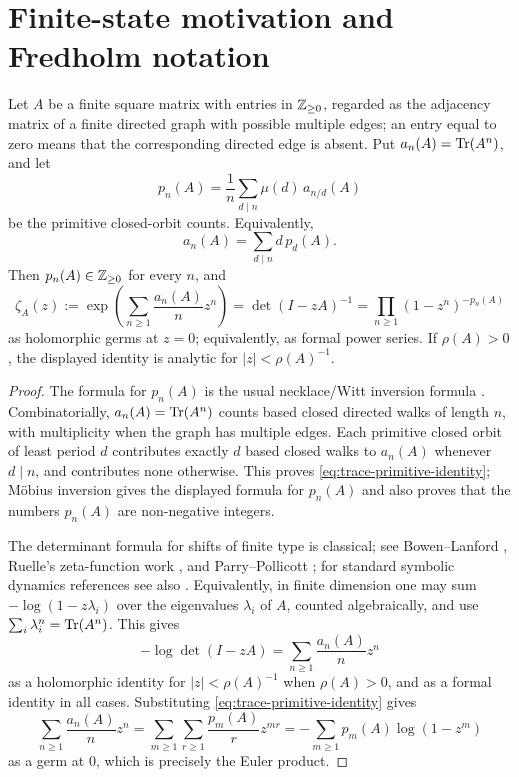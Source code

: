 \section{Finite-state motivation and Fredholm notation}
\label{sec:preliminaries}

\begin{proposition}
  \label{prop:primitive-symbolic-exclusion}
  Let \(A\) be a finite square matrix with entries in \(\mathbb{Z}_{\ge0}\), regarded
  as the adjacency matrix of a finite directed graph with possible multiple
  edges; an entry equal to zero means that the corresponding directed edge is
  absent. Put \(a_n(A)=\operatorname{Tr}(A^n)\), and let
  \[
    p_n(A)=\frac{1}{n}\sum_{d\mid n}\mu(d)\,a_{n/d}(A)
  \]
  be the primitive closed-orbit counts. Equivalently,
  \begin{equation}\label{eq:trace-primitive-identity}
    a_n(A)=\sum_{d\mid n}d\,p_d(A).
  \end{equation}
  Then \(p_n(A)\in\mathbb{Z}_{\ge0}\) for every \(n\), and
  \[
    \zeta_A(z)
    :=\exp\!\left(\sum_{n\ge 1}\frac{a_n(A)}{n}z^n\right)
    =\det(I-zA)^{-1}
    =\prod_{n\ge 1}(1-z^n)^{-p_n(A)}
  \]
  as holomorphic germs at \(z=0\); equivalently, as formal power series.
  If \(\rho(A)>0\), the displayed identity is analytic for
  \(|z|<\rho(A)^{-1}\).
\end{proposition}

\begin{proof}
  The formula for \(p_n(A)\) is the usual necklace/Witt inversion formula
  \cite{MetropolisRota1983}. Combinatorially, \(a_n(A)=\operatorname{Tr}(A^n)\) counts
  based closed directed walks of length \(n\), with multiplicity when the
  graph has multiple edges. Each primitive closed orbit of least period
  \(d\) contributes exactly \(d\) based closed walks to \(a_n(A)\) whenever
  \(d\mid n\), and contributes none otherwise. This proves
  \eqref{eq:trace-primitive-identity}; Möbius inversion gives the displayed
  formula for \(p_n(A)\) and also proves that the numbers \(p_n(A)\) are
  non-negative integers.

  The determinant formula for shifts of finite type is classical; see
  Bowen--Lanford \cite{BowenLanford1970Zeta}, Ruelle's zeta-function work
  \cite{Ruelle1976ZetaExpanding,Ruelle1978Thermodynamic}, and
  Parry--Pollicott \cite{ParryPollicott1990Zeta}; for standard symbolic
  dynamics references see also \cite{ArtinMazur1965,LindMarcus1995}.
  Equivalently,
  in finite dimension one may sum \(-\log(1-z\lambda_i)\) over the
  eigenvalues \(\lambda_i\) of \(A\), counted algebraically, and use
  \(\sum_i\lambda_i^n=\operatorname{Tr}(A^n)\). This gives
  \[
    -\log\det(I-zA)
    =\sum_{n\ge1}\frac{a_n(A)}{n}z^n
  \]
  as a holomorphic identity for \(|z|<\rho(A)^{-1}\) when \(\rho(A)>0\),
  and as a formal identity in all cases. Substituting
  \eqref{eq:trace-primitive-identity} gives
  \[
    \sum_{n\ge1}\frac{a_n(A)}{n}z^n
    =\sum_{m\ge1}\sum_{r\ge1}\frac{p_m(A)}{r}z^{mr}
    =-\sum_{m\ge1}p_m(A)\log(1-z^m)
  \]
  as a germ at \(0\), which is precisely the Euler product.
\end{proof}

